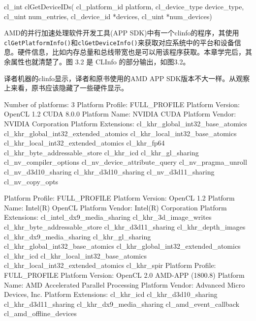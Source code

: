 \begin{codebox}[cpp]
cl_int
clGetDeviceIDs(
  cl_platform_id platform,
  cl_device_type device_type,
  cl_uint num_entries,
  cl_device_id *devices,
  cl_uint *num_devices)
\end{codebox}

AMD的并行加速处理软件开发工具(APP SDK)中有一个clinfo的程序，其使用\texttt{clGetPlatformInfo()}和\texttt{clGetDeviceInfo()}来获取对应系统中的平台和设备信息。硬件信息，比如内存总量和总线带宽也是可以用该程序获取。本章学完后，其余属性也就清楚了。图 3.2 是 CLInfo 的部分输出，如图3.2。

译者机器的clinfo显示，译者和原书使用的AMD APP SDK版本不大一样。从观察上来看，原书应该隐藏了一些硬件显示。

\begin{codebox}[text]
Number of platforms:                             3
  Platform Profile:                              FULL_PROFILE
  Platform Version:                              OpenCL 1.2 CUDA 8.0.0
  Platform Name:                                 NVIDIA CUDA
  Platform Vendor:                               NVIDIA Corporation
  Platform Extensions:
   cl_khr_global_int32_base_atomics
   cl_khr_global_int32_extended_atomics
   cl_khr_local_int32_base_atomics
   cl_khr_local_int32_extended_atomics
   cl_khr_fp64
   cl_khr_byte_addressable_store
   cl_khr_icd cl_khr_gl_sharing
   cl_nv_compiler_options
   cl_nv_device_attribute_query
   cl_nv_pragma_unroll
   cl_nv_d3d10_sharing
   cl_khr_d3d10_sharing
   cl_nv_d3d11_sharing
   cl_nv_copy_opts

  Platform Profile:                              FULL_PROFILE
  Platform Version:                              OpenCL 1.2
  Platform Name:                                 Intel(R) OpenCL
  Platform Vendor:                               Intel(R) Corporation
  Platform Extensions:
   cl_intel_dx9_media_sharing
   cl_khr_3d_image_writes
   cl_khr_byte_addressable_store
   cl_khr_d3d11_sharing
   cl_khr_depth_images
   cl_khr_dx9_media_sharing
   cl_khr_gl_sharing
   cl_khr_global_int32_base_atomics
   cl_khr_global_int32_extended_atomics
   cl_khr_icd cl_khr_local_int32_base_atomics
   cl_khr_local_int32_extended_atomics
   cl_khr_spir
  Platform Profile:                              FULL_PROFILE
  Platform Version:                              OpenCL 2.0 AMD-APP (1800.8)
  Platform Name:                                 AMD Accelerated Parallel Processing
  Platform Vendor:                               Advanced Micro Devices, Inc.
  Platform Extensions:
   cl_khr_icd
   cl_khr_d3d10_sharing
   cl_khr_d3d11_sharing
   cl_khr_dx9_media_sharing
   cl_amd_event_callback
   cl_amd_offline_devices


\end{codebox}
